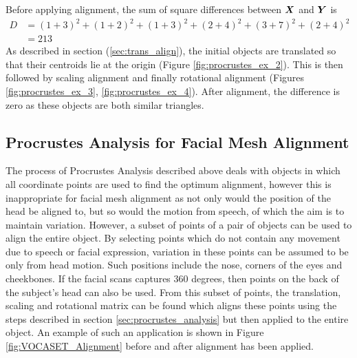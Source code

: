 Before applying alignment, the sum of square differences between ${\boldsymbol{{X}}}$ and ${\boldsymbol{{Y}}}$ is
\begin{align*}
    D& = {(1+3)^2 + (1+2)^2} + {(1+3)^2 + (2+4)^2} + {(3+7)^2 + (2+4)^2} \\
     & = 213
\end{align*}
As described in section (\ref{sec:trans_align}), the initial objects are translated so that their centroids lie at the origin (Figure \ref{fig:procrustes_ex_2}). This is then followed by scaling alignment and finally rotational alignment (Figures \ref{fig:procrustes_ex_3}, \ref{fig:procrustes_ex_4}).
After alignment, the difference is zero as these objects are both similar triangles.

\subsection{Procrustes Analysis for Facial Mesh Alignment}
The process of Procrustes Analysis described above deals with objects in which all coordinate points are used to find the optimum alignment, however this is inappropriate for facial mesh alignment as not only would the position of the head be aligned to, but so would the motion from speech, of which the aim is to maintain variation.
However, a subset of points of a pair of objects can be used to align the entire object.
By selecting points which do not contain any movement due to speech or facial expression, variation in these points can be assumed to be only from head motion.
Such positions include the nose, corners of the eyes and cheekbones.
If the facial scans captures 360 degrees, then points on the back of the subject's head can also be used.
From this subset of points, the translation, scaling and rotational matrix can be found which aligns these points using the steps described in section \ref{sec:procrustes_analysis} but then applied to the entire object.
An example of such an application is shown in Figure \ref{fig:VOCASET_Alignment} before and after alignment has been applied.

